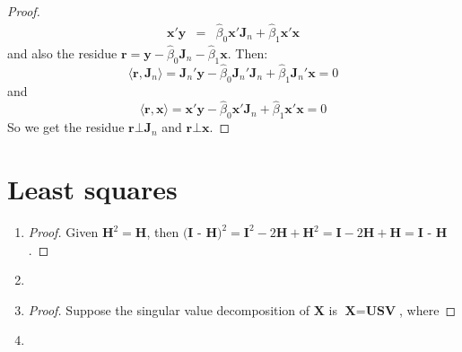 \documentclass[12pt]{article}
\newcommand{\ttt}[1]{\textbf{#1}}
\begin{document}
\begin{enumerate}
\begin{proof}
\begin{eqnarray}
            \textbf{x}'\textbf{y} &=& \hat{\beta}_0 \textbf{x}'\textbf{J}_n + \hat{\beta}_1 \textbf{x}'\textbf{x}
        \end{eqnarray} 
    and also the residue $\textbf{r} = \textbf{y} - \hat{\beta}_0 \textbf{J}_n - \hat{\beta}_1 \textbf{x}$.
    Then: 
    $$\langle \textbf{r}, \textbf{J}_n \rangle = \textbf{J}_n'\textbf{y} - \hat{\beta}_0 \textbf{J}_n'\textbf{J}_n + \hat{\beta}_1 \textbf{J}_n'\textbf{x} = 0$$
    and
    $$\langle \textbf{r}, \textbf{x} \rangle = \textbf{x}'\textbf{y} - \hat{\beta}_0 \textbf{x}'\textbf{J}_n + \hat{\beta}_1 \textbf{x}'\textbf{x} = 0$$
    So we get the residue $\textbf{r} \bot \textbf{J}_n$ and $\textbf{r} \bot \textbf{x}$.
    \end{proof}
\end{enumerate}

\section{Least squares}

\begin{enumerate}
    \item
    \begin{proof}
        Given $\textbf{H}^2 = \textbf{H}$, then $\textbf{(I - H)}^2 = \textbf{I}^2 - 2 \textbf{H} + \textbf{H}^2 = \textbf{I} - 2 \textbf{H} + \textbf{H} = \textbf{I - H}$.
    \end{proof}
    \item
    \item
    \begin{proof}
        Suppose the singular value decomposition of $\ttt{X}$ is $\ttt{X} = \ttt{U} \ttt{S} \ttt{V}$, where 
    \end{proof}
    \item
\end{enumerate}
\end{document}
